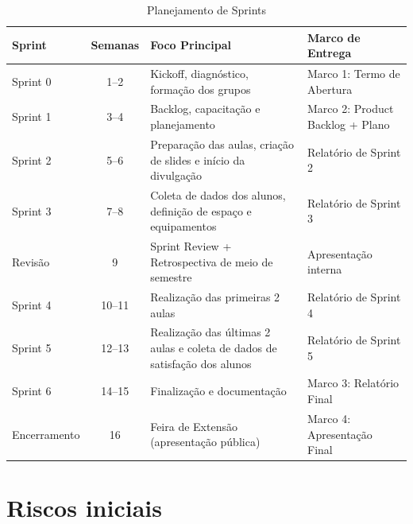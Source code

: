 \documentclass[12pt, a4paper]{article}
\begin{document}
\begin{table}[H]
\centering
\begin{tabular}{l c p{6cm} p{4cm}}
\toprule
\textbf{Sprint} & \textbf{Semanas} & \textbf{Foco Principal} & \textbf{Marco de Entrega} \\
\midrule

Sprint 0 & 1--2 & Kickoff, diagnóstico, formação dos grupos & Marco 1: Termo de Abertura \\

Sprint 1 & 3--4 & Backlog, capacitação e planejamento & Marco 2: Product Backlog + Plano \\

Sprint 2 & 5--6 & Preparação das aulas, criação de slides e início da divulgação & Relatório de Sprint 2 \\

Sprint 3 & 7--8 & Coleta de dados dos alunos, definição de espaço e equipamentos & Relatório de Sprint 3 \\

Revisão & 9 & Sprint Review + Retrospectiva de meio de semestre & Apresentação interna \\

Sprint 4 & 10--11 & Realização das primeiras 2 aulas & Relatório de Sprint 4 \\

Sprint 5 & 12--13 & Realização das últimas 2 aulas e coleta de dados de satisfação dos alunos & Relatório de Sprint 5 \\

Sprint 6 & 14--15 & Finalização e documentação & Marco 3: Relatório Final \\

Encerramento & 16 & Feira de Extensão (apresentação pública) & Marco 4: Apresentação Final \\

\bottomrule
\end{tabular}
\caption{Planejamento de Sprints}
\end{table}

\section{Riscos iniciais}
\end{document}
